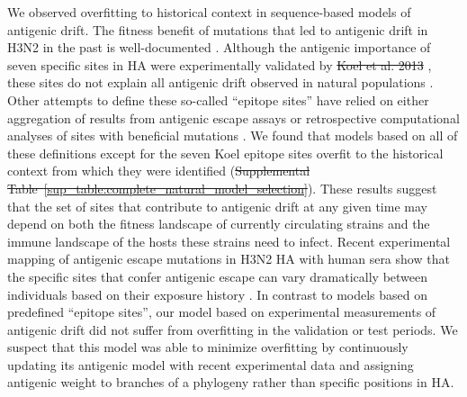 \documentclass[9pt,lineno]{elife} %
\providecommand{\DIFadd}[1]{{\protect\color{blue}\uwave{#1}}} %
\providecommand{\DIFdel}[1]{{\protect\color{red}\sout{#1}}}                      %
\providecommand{\DIFaddbegin}{} %
\providecommand{\DIFaddend}{} %
\providecommand{\DIFdelbegin}{} %
\providecommand{\DIFdelend}{} %
\providecommand{\DIFaddtex}[1]{{\protect\color{blue}\uwave{#1}}} %
\providecommand{\DIFdeltex}[1]{{\protect\color{red}\sout{#1}}}                      %
\providecommand{\DIFaddbegin}{} %
\providecommand{\DIFaddend}{} %
\providecommand{\DIFdelbegin}{} %
\providecommand{\DIFdelend}{} %
\providecommand{\DIFadd}[1]{\texorpdfstring{\DIFaddtex{#1}}{#1}} %
\providecommand{\DIFdel}[1]{\texorpdfstring{\DIFdeltex{#1}}{}} %
\newcommand{\DIFscaledelfig}{0.5}
\newlength{\DIFdelgraphicswidth} %
\newlength{\DIFdelgraphicsheight} %
\newcommand{\DIFaddincludegraphics}[2][]{{\color{blue}\fbox{\DIFOincludegraphics[#1]{#2}}}} %
\newcommand{\DIFdelincludegraphics}[2][]{%
\sbox{\DIFdelgraphicsbox}{\DIFOincludegraphics[#1]{#2}}%
\settoboxwidth{\DIFdelgraphicswidth}{\DIFdelgraphicsbox} %
\settoboxtotalheight{\DIFdelgraphicsheight}{\DIFdelgraphicsbox} %
\scalebox{\DIFscaledelfig}{%
\parbox[b]{\DIFdelgraphicswidth}{\usebox{\DIFdelgraphicsbox}\\[-\baselineskip] \rule{\DIFdelgraphicswidth}{0em}}\llap{\resizebox{\DIFdelgraphicswidth}{\DIFdelgraphicsheight}{%
\setlength{\unitlength}{\DIFdelgraphicswidth}%
\begin{picture}(1,1)%
\thicklines\linethickness{2pt} %
{\color[rgb]{1,0,0}\put(0,0){\framebox(1,1){}}}%
{\color[rgb]{1,0,0}\put(0,0){\line( 1,1){1}}}%
{\color[rgb]{1,0,0}\put(0,1){\line(1,-1){1}}}%
\end{picture}%
}\hspace*{3pt}}} %
} %
\DeclareRobustCommand{\DIFaddbegin}{\DIFOaddbegin \let\includegraphics\DIFaddincludegraphics} %
\DeclareRobustCommand{\DIFaddend}{\DIFOaddend \let\includegraphics\DIFOincludegraphics} %
\DeclareRobustCommand{\DIFdelbegin}{\DIFOdelbegin \let\includegraphics\DIFdelincludegraphics} %
\DeclareRobustCommand{\DIFdelend}{\DIFOaddend \let\includegraphics\DIFOincludegraphics} %
\begin{document}
We observed overfitting to historical context in sequence-based models of antigenic drift.
The fitness benefit of mutations that led to antigenic drift in H3N2 in the past is well-documented \DIFdelbegin %
\DIFdelend \DIFaddbegin \citep{Wiley:1981bc,Smith:2004jc,Wolf:2006da,Koel:2013jz}\DIFaddend .
Although the antigenic importance of seven specific sites in HA were experimentally validated by \DIFdelbegin \DIFdel{Koel et al. 2013 }\DIFdelend \cite{Koel:2013jz}, these sites do not explain all antigenic drift observed in natural populations \DIFdelbegin %
\DIFdelend \DIFaddbegin \citep{Neher:2016hy}\DIFaddend .
Other attempts to define these so-called ``epitope sites'' have relied on either aggregation of results from antigenic escape assays \DIFdelbegin %
\DIFdelend \DIFaddbegin \citep{Wolf:2006da} \DIFaddend or retrospective computational analyses of sites with beneficial mutations \DIFdelbegin %
\DIFdelend \DIFaddbegin \citep{Shih:2007bd,Luksza:2014hj}\DIFaddend .
We found that models based on all of these definitions except for the seven Koel epitope sites overfit to the historical context from which they were identified (\DIFdelbegin \DIFdel{Supplemental Table~\ref{sup_table:complete_natural_model_selection}}\DIFdelend \DIFaddbegin \DIFadd{Table~\ref{table:complete_natural_model_selection}}\DIFaddend ).
These results suggest that the set of sites that contribute to antigenic drift at any given time may depend on both the fitness landscape of currently circulating strains and the immune landscape of the hosts these strains need to infect.
Recent experimental mapping of antigenic escape mutations in H3N2 HA with human sera show that the specific sites that confer antigenic escape can vary dramatically between individuals based on their exposure history \DIFdelbegin %
\DIFdelend \DIFaddbegin \citep{Lee2019}\DIFaddend .
In contrast to models based on predefined ``epitope sites'', our model based on experimental measurements of antigenic drift did not suffer from overfitting in the validation or test periods.
We suspect that this model was able to minimize overfitting by continuously updating its antigenic model with recent experimental data and assigning antigenic weight to branches of a phylogeny rather than specific positions in HA.
\end{document}
